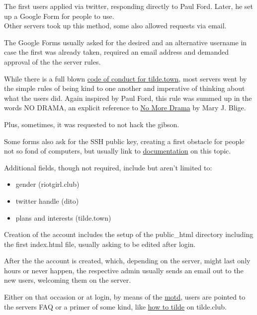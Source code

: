 The first users applied via twitter, responding directly to Paul Ford. Later, he set up a Google Form for people to use.\\
Other servers took up this method, some also allowed requests via email.

The Google Forms usually asked for the desired and an alternative username in case the first was already taken, required an email address and demanded approval of the the server rules.

While there is a full blown \href{http://www.tilde.town/~wiki/conduct.html}{code of conduct for tilde.town}, most servers went by the simple rules of being kind to one another and imperative of thinking about what the users did. Again inspired by Paul Ford, this rule was summed up in the words NO DRAMA, an explicit reference  to \href{https://en.wikipedia.org/wiki/No_More_Drama_(song)}{No More Drama} by Mary J. Blige.

Plus, sometimes, it was requested to not hack the gibson.

Some forms also ask for the SSH public key, creating a first obstacle for people not so fond of computers, but usually link to \href{https://github.com/tildeclub/tilde.club/blob/master/docs/ssh.md}{documentation} on this topic.

Additional fields, though not required, include but aren't limited to:
\begin{itemize}
	\item gender (riotgirl.club)
	\item twitter handle (dito)
	\item plans and interests (tilde.town)
\end{itemize}

Creation of the account includes the setup of the public\_html directory including the first index.html file, usually asking to be edited after login.

After the the account is created, which, depending on the server, might last only hours or never happen, the respective admin usually sends an email out to the new users, welcoming them on the server.

Either on that occasion or at login, by means of the \href{https://en.wikipedia.org/wiki/Motd_(Unix)}{motd}, users are pointed to the servers FAQ or a primer of some kind, like \href{http://tilde.club/~anthonydpaul/primer.html}{how to tilde} on tilde.club.


